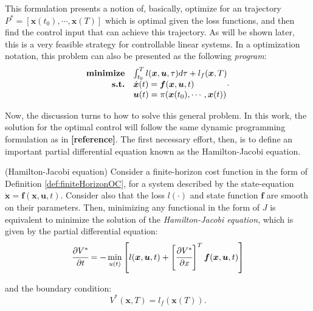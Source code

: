\documentclass[a4paper,11pt]{book}
\numberwithin{figure}{chapter}
\numberwithin{equation}{chapter}
\numberwithin{table}{chapter}
\newtheorem{theorem}{Theorem}[chapter]
\theoremstyle{definition}
\newcounter{boxed-theorem}
\newenvironment{boxed-theorem}[1]
{\begin{shaded} \begin{theorem}{#1}}
{\end{theorem} \end{shaded}}
\newcounter{boxed-definition}
\begin{document}
This formulation presents a notion of, basically, optimize for an trajectory $P^* = [\bm{x}(t_0), \cdots, \bm{x}(T)]$ which is optimal given the loss functions, and then find the control input that can achieve this trajectory. As will be shown later, this is a very feasible strategy for controllable linear systems. In a optimization notation, this problem can also be presented as the following \textit{program}: 
\begin{align}
\begin{matrix*}[l]
    \textbf{minimize} & \int_{t_0}^T l(\bm{x}, \bm{u}, \tau) d \tau + l_f(\bm{x}, T) \\
    \hfill \textbf{s.t.} & \dot{\bm{x}}(t) = \bm{f}(\bm{x}, \bm{u}, t)  \\
                & \bm{u}(t) = \pi(\bm{x}(t_0), \cdots, \bm{x}(t))
\end{matrix*}
.\end{align}

Now, the discussion turns to how to solve this general problem. In this work, the solution for the optimal control will follow the same dynamic programming formulation as in \textbf{[reference]}. The first necessary effort, then, is to define an important partial differential equation known as the Hamilton-Jacobi equation.

\begin{boxed-theorem}{(Hamilton-Jacobi equation)} \label{th:hamiltonJacobi}
    Consider a finite-horizon cost function in the form of Definition \ref{def:finiteHorizonOC}, for a system described by the state-equation $\dot{\bm{x}} = \bm{f}(\bm{x}, \bm{u}, t)$. Consider also that the loss $l(\cdot)$ and state function $\bm{f}$ are smooth on their parameters. Then, minimizing any functional in the form of $J$ is equivalent to minimize the solution of the \textit{Hamilton-Jacobi equation}, which is given by the partial differential equation:
    \begin{equation} \label{eq:HJEquation}
        \cfrac{\partial V^*}{\partial t} = - \min_{u(t)} \left[ l(\bm{x}, \bm{u}, t) + \left[ \cfrac{\partial V^*}{\partial x} \right]^T \bm{f}(\bm{x}, \bm{u}, t)  \right]
    \end{equation}
    
    \noindent and the boundary condition:
    \begin{equation}
        V^*(\bm{x}, T) = l_f(\bm{x}(T))
    .\end{equation}
\end{boxed-theorem}
\end{document}
